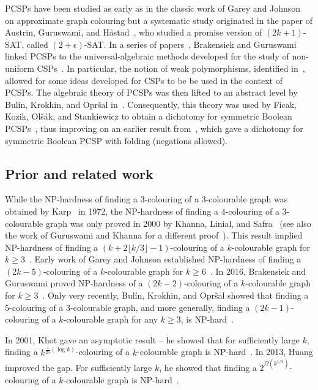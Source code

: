 \documentclass[11pt,a4paper]{scrartcl}
\numberwithin{theorem}{section}
\theoremstyle{definition}
\begin{document}
PCSPs have been studied as early as in the classic work of Garey and
Johnson~\cite{Garey76:jacm} on approximate graph colouring but a systematic
study originated in the paper of Austrin, Guruswami, and H{\aa}stad~\cite{Austrin17:sicomp}, who studied a promise version of
$(2k+1)$-SAT, called $(2+\epsilon)$-SAT. In a series of
papers~\cite{Brakensiek16:ccc,Brakensiek18:soda,Brakensiek19:soda}, Brakensiek
and Guruswami linked PCSPs to the universal-algebraic methods developed for the
study of non-uniform CSPs~\cite{bkw17:survey}. In particular, the notion of weak
polymorphisms, identified in~\cite{Austrin17:sicomp}, allowed for some ideas 
developed for CSPs to be be used in the context of PCSPs. The algebraic
theory of PCSPs was then lifted to an abstract level by Bul\'in, Krokhin, and
Opr\v{s}al in~\cite{BulinKO18}. Consequently, this theory was used by Ficak,
Kozik, Ol\v{s}\'ak, and Stankiewicz to obtain a dichotomy for symmetric Boolean
PCSPs~\cite{Ficak19:icalp}, thus improving on an earlier result
from~\cite{Brakensiek18:soda}, which gave a dichotomy for symmetric Boolean PCSP
with folding (negations allowed).

\subsection{Prior and related work}
\label{sec:related}

While the NP-hardness of finding a $3$-colouring of a $3$-colourable graph was
obtained by Karp~\cite{Karp72:reducibility} in 1972, the NP-hardness of finding
a $4$-colouring of a $3$-colourable graph was only proved in 2000 by Khanna,
Linial, and Safra~\cite{Khanna00:combinatorica} (see also the work of Guruswami
and Khanna for a different proof~\cite{Guruswami04:sidma}). This result implied
NP-hardness of finding a $(k+2\lfloor k/3\rfloor-1)$-colouring of a
$k$-colourable graph for $k\geq 3$~\cite{Khanna00:combinatorica}. Early work of
Garey and Johnson established NP-hardness of finding a $(2k-5)$-colouring of a
$k$-colourable graph for $k\geq 6$~\cite{Garey76:jacm}. In 2016, Brakensiek and
Guruswami proved NP-hardness of a $(2k-2)$-colouring of a $k$-colourable
graph for $k\geq 3$~\cite{Brakensiek16:ccc}. Only very recently, Bul\'in,
Krokhin, and Opr\v{s}al showed that finding a  $5$-colouring of a $3$-colourable
graph, and more generally, finding a $(2k-1)$-colouring of a $k$-colourable
graph for any $k\geq 3$, is NP-hard~\cite{BulinKO18}. 

In 2001, Khot gave an asymptotic result -- he showed that for sufficiently large $k$, finding a $k^{\frac{1}{25}(\log k)}$-colouring of a
$k$-colourable graph is NP-hard~\cite{Khot01}. In 2013, Huang improved the gap.
For sufficiently large $k$, he showed that 
finding a $2^{\Omega(k^{1/3})}$-colouring of a $k$-colourable graph is
NP-hard~\cite{Huang13}.
\end{document}
